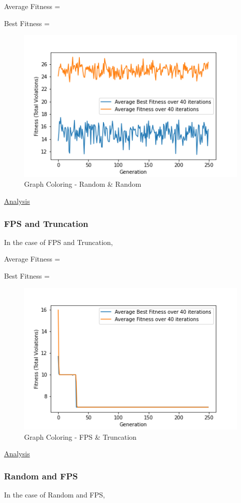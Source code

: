 \documentclass[11pt, letterpaper]{article}
\begin{document}
Average Fitness = 

Best Fitness = 
\begin{figure}[H]
    \centering
    \includegraphics[scale = 0.6]{images/graphcoloring_rd_rd.png}
    \caption {Graph Coloring - Random \& Random}
    \label {fig:gcRR}
\end{figure}

\underline{Analysis}
\subsubsection {FPS and Truncation}
In the case of FPS and Truncation,

Average Fitness = 

Best Fitness = 
\begin{figure}[H]
    \centering
    \includegraphics[scale = 0.6]{images/graphcoloring_fp_tr.png}
    \caption {Graph Coloring - FPS \& Truncation}
    \label {fig:gcFT}
\end{figure}

\underline{Analysis}

\subsubsection {Random and FPS}
In the case of Random and FPS,
\end{document}
